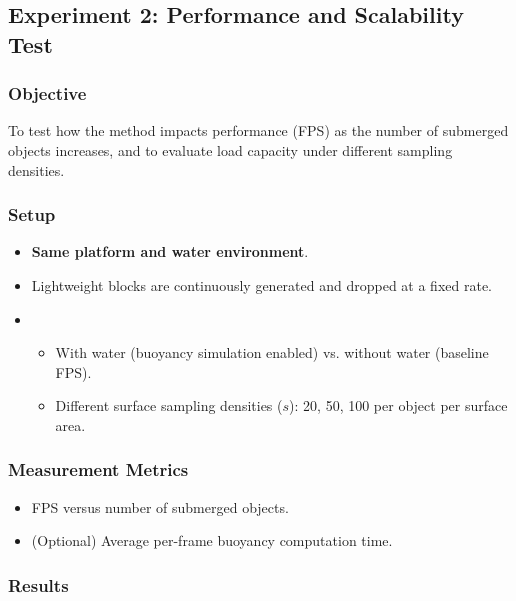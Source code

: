 \subsection*{Experiment 2: Performance and Scalability Test}

\subsubsection*{Objective}
To test how the method impacts performance (FPS) as the number of submerged objects increases, and to evaluate load capacity under different sampling densities.

\subsubsection*{Setup}
\begin{itemize}
		\item \textbf{Same platform and water environment}.
		\item {} Lightweight blocks are continuously generated and dropped at a fixed rate.
		\item {}
		\begin{itemize}
				\item With water (buoyancy simulation enabled) vs. without water (baseline FPS).
				\item Different surface sampling densities ($s$): 20, 50, 100 per object per surface area.
		\end{itemize}
\end{itemize}

\subsubsection*{Measurement Metrics}
\begin{itemize}
		\item FPS versus number of submerged objects.
		\item (Optional) Average per-frame buoyancy computation time.
\end{itemize}

\subsubsection*{Results}

